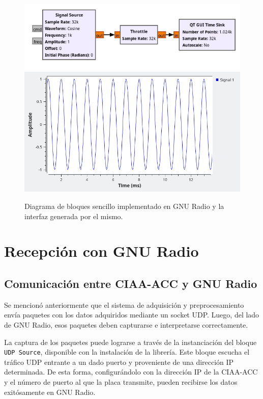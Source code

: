 \documentclass[../../main.tex]{subfiles}
\begin{document}
\begin{figure}[H]
    \centering
    {\includegraphics[width=0.5\linewidth]{gnu-dummy-bd.png}}\\[1PC]
    {\includegraphics[width=0.5\linewidth]{gnu-dummy-plot.png}}
    \caption{Diagrama de bloques sencillo implementado en GNU Radio y la interfaz generada por el mismo.}
    \label{fig::gnu-dummy}
\end{figure}

\section{Recepción con GNU Radio}
\subsection{Comunicación entre CIAA-ACC y GNU Radio}
Se mencionó anteriormente que el sistema de adquisición y preprocesamiento envía paquetes con los datos adquiridos mediante un socket UDP. Luego, del lado de GNU Radio, esos paquetes deben capturarse e interpretarse correctamente. 

La captura de los paquetes puede lograrse a través de la instanciación del bloque \texttt{UDP Source}, disponible con la instalación de la librería. Este bloque escucha el tráfico UDP entrante a un dado puerto y proveniente de una dirección IP  determinada. De esta forma, configurándolo con la dirección IP de la CIAA-ACC y el número de puerto al que la placa transmite, pueden recibirse los datos exitósamente en GNU Radio. 
\end{document}
